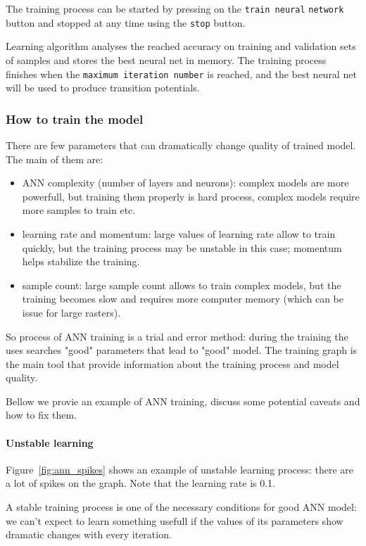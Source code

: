 \documentclass{report}
\begin{document}
The training process can be started by pressing on the \verb+train neural+ \verb+network+ button and stopped at any time
using the \verb+stop+ button.

Learning algorithm analyses the reached accuracy on training and validation sets of samples and
stores the best neural net in memory. The training process finishes when the \verb+maximum iteration number+ is
reached, and the best neural net will be used to produce transition potentials.

\subsubsection{How to train the model}
There are few parameters that can dramatically change quality of trained model. 
The main of them are:
\begin{itemize}
  \item ANN complexity (number of layers and neurons): complex models are more powerfull, but training them properly is hard process, complex models require more samples to train etc. 
  \item learning rate and momentum: large values of learning rate allow to train quickly, but the training process may be unstable in this case; momentum helps stabilize the training.
  \item sample count: large sample count allows to train complex models, but the training becomes slow and requires more computer memory (which can be issue for large rasters).
\end{itemize}

So process of ANN training is a trial and error method: during the training the uses searches "good" parameters that lead to "good" model.
The training graph is the main tool that provide information about the training process and model quality.

Bellow we provie an example of ANN training, discuss some potential caveats and how to fix them.


\paragraph{Unstable learning} Figure~\ref{fig:ann_spikes} shows an example of unstable learning process: there are a lot of spikes on the graph.
Note that the learning rate is 0.1.

A stable training process is one of the necessary conditions for good ANN model: we can't expect 
to learn something usefull if the  values of its parameters show dramatic changes with every iteration.
\end{document}
